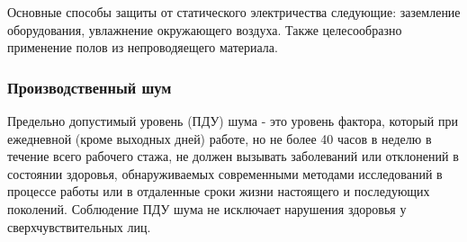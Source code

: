 Основные способы защиты от статического электричества следующие: заземление оборудования, увлажнение окружающего воздуха. Также целесообразно применение полов из непроводяещего материала.


\subsubsection{Производственный шум}


Предельно допустимый уровень (ПДУ) шума - это уровень фактора, который при ежедневной (кроме выходных дней) работе, но не более 40 часов в неделю в течение всего рабочего стажа, не должен вызывать заболеваний или отклонений в состоянии здоровья, обнаруживаемых современными методами исследований в процессе работы или в отдаленные сроки жизни настоящего и последующих поколений. 
Соблюдение ПДУ шума не исключает нарушения здоровья у сверхчувствительных лиц.

